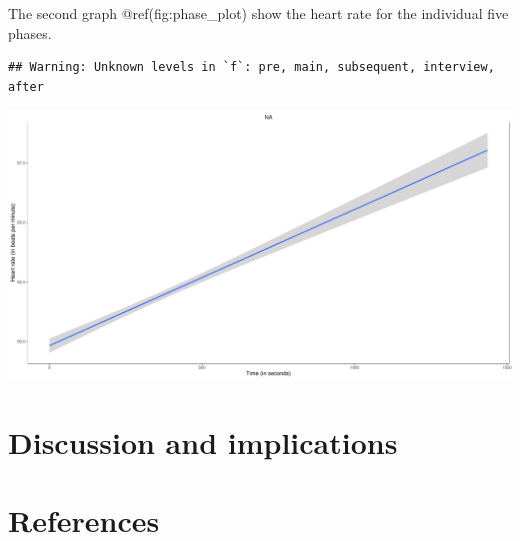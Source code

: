\documentclass[
  man,floatsintext]{apa6}
\begin{document}
The second graph @ref(fig:phase\_plot) show the heart rate for the individual five phases.

\begin{verbatim}
## Warning: Unknown levels in `f`: pre, main, subsequent, interview, after
\end{verbatim}

\includegraphics{fitbit_paper_files/figure-latex/phase_plot-1.pdf}

\hypertarget{discussion-and-implications}{%
\section{Discussion and implications}\label{discussion-and-implications}}

\newpage

\hypertarget{references}{%
\section{References}\label{references}}
\end{document}
